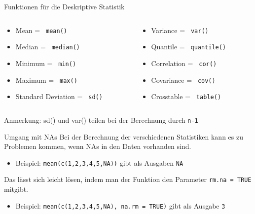 \documentclass[xcolor=dvipsnames, aspectratio = 169]{beamer}
\begin{document}
\begin{frame}[fragile]{Funktionen für die Deskriptive Statistik}
\begin{columns}[T]
	\begin{column}{0.5\textwidth}
		\begin{itemize}
			\item Mean = \verb+ mean() +
			\item Median = \verb+ median() +
			\item Minimum = \verb+ min() +
			\item Maximum = \verb+ max() +
			\item Standard Deviation = \verb+ sd() +
		\end{itemize}
	\end{column}
	\begin{column}{0.5\textwidth}
		\begin{itemize}
			\item Variance = \verb+ var() +
			\item Quantile = \verb+ quantile() +
			\item Correlation = \verb+ cor() +
			\item Covariance = \verb+ cov() +
			\item Crosstable = \verb+ table() +
		\end{itemize}
	\end{column}
\end{columns}
Anmerkung: sd() und var() teilen bei der Berechnung durch \verb+n-1+
\end{frame}

\begin{frame}[fragile]{Umgang mit NAs}
	Bei der Berechnung der verschiedenen Statistiken kann es zu Problemen kommen, wenn NAs in den Daten vorhanden sind.\\
	\begin{itemize}
			\item Beispiel: \verb+mean(c(1,2,3,4,5,NA))+ gibt als Ausgaben \verb+NA+\\
	\end{itemize}
	Das lässt sich leicht lösen, indem man der Funktion den Parameter \verb+rm.na = TRUE+ mitgibt.\\
	\begin{itemize}
			\item Beispiel: \verb+mean(c(1,2,3,4,5,NA), na.rm = TRUE)+ gibt als Ausgabe \verb+3+
	\end{itemize}
\end{frame}
\end{document}
